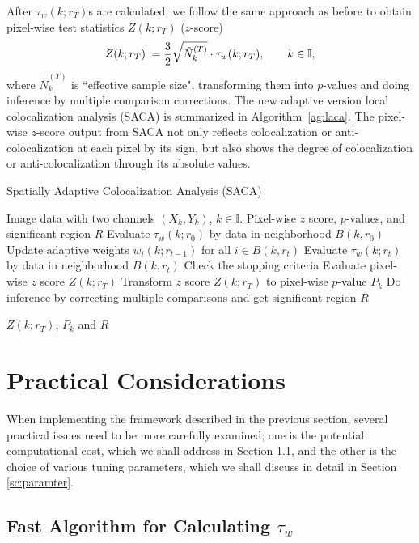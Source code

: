 \documentclass[10pt,twocolumn,twoside]{IEEEtran}
\def\II{{\mathbb I}}
\begin{document}
After $\tau_w(k;r_T)$s are calculated, we follow the same approach as before to obtain pixel-wise test statistics $Z(k;r_T)$ ($z$-score)
$$
Z(k;r_T):={3\over 2}\sqrt{\tilde{N}^{(T)}_k} \cdot \tau_w(k;r_T),\qquad k\in\II,
$$
where $\tilde{N}^{(T)}_k$ is ``effective sample size", transforming them into $p$-values and doing inference by multiple comparison corrections. The new adaptive version local colocalization analysis (SACA) is summarized in Algorithm~\ref{ag:laca}. The pixel-wise $z$-score output from SACA not only reflects colocalization or anti-colocalization at each pixel by its sign, but also shows the degree of colocalization or anti-colocalization through its absolute values. 

\begin{algorithm}[h!]
\caption{Spatially Adaptive Colocalization Analysis (SACA)}
\label{ag:laca}
\begin{algorithmic}
\REQUIRE Image data with two channels $(X_k,Y_k)$, $k\in \II$.
\ENSURE Pixel-wise $z$ score, $p$-values, and significant region $R$
\STATE Evaluate  $\tau_w(k;r_0)$ by data in neighborhood $B(k,r_0)$
\STATE Update adaptive weights $w_i(k;r_{t-1})$ for all $i\in B(k,r_t)$
\STATE Evaluate $\tau_w(k;r_t)$ by data in neighborhood $B(k,r_t)$
\STATE Check the stopping criteria 
\ENDFOR
\STATE Evaluate pixel-wise $z$ score $Z(k;r_T)$
\STATE Transform $z$ score $Z(k;r_T)$ to pixel-wise $p$-value $P_k$
\STATE Do inference by correcting multiple comparisons and get significant region $R$

\RETURN $Z(k;r_T)$, $P_k$ and $R$
\end{algorithmic}
\end{algorithm}

\section{Practical Considerations}

When implementing the framework described in the previous section, several practical issues need to be more carefully examined; one is the potential computational cost, which we shall address in Section \ref{sc:fastalgm}, and the other is the choice of various tuning parameters, which we shall discuss in detail in Section \ref{sc:paramter}.

\subsection{Fast Algorithm for Calculating $\tau_w$}
\label{sc:fastalgm}
\end{document}
